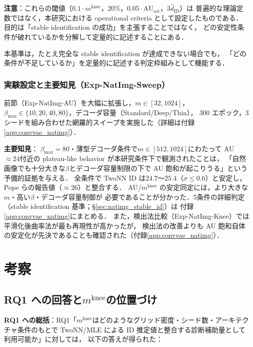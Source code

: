 \documentclass[11pt,a4paper]{jsarticle}
\newcommand{\AUsat}{\mathrm{AU}_{\mathrm{sat}}}
\newcommand{\mknee}{m^{\mathrm{knee}}}
\begin{document}
\textbf{注意}：これらの閾値（$0.1\cdot\mknee$，$20\%$，$0.05\cdot\AUsat$，$3\hat{d}_\mathrm{ID}$）は
普遍的な理論定数ではなく，本研究における operational criteria として設定したものである．
目的は「stable identification の成功」を主張することではなく，
どの安定性条件が破れているかを分解して定量的に記述することにある．

本基準は，たとえ完全な stable identification が達成できない場合でも，
「どの条件が不足しているか」を定量的に記述する判定枠組みとして機能する．

\subsubsection*{実験設定と主要知見（Exp-NatImg-Sweep）}

前節（Exp-NatImg-AU）を大幅に拡張し，$m \in [32, 1024]$，
$\beta_{\max} \in \{10,20,40,80\}$，デコーダ容量（Standard/Deep/Thin），
300 エポック，3シードを組み合わせた網羅的スイープを実施した（詳細は付録\ref{app:convvae_natimg}）．

\textbf{主要知見}：
$\beta_{\max}=80$・薄型デコーダ条件で$m \in [512, 1024]$にわたって AU$\approx 24$付近の
plateau-like behavior が本研究条件下で観測されたことは，
「自然画像でも十分大きな$\beta$とデコーダ容量制限の下で AU 飽和が起こりうる」という
予備的証拠を与える．
全条件で TwoNN ID は$24.7$〜$25.4$（$\sigma \leq 0.6$）と安定し，
Pope ら\cite{pope2021intrinsic}の報告値（$\approx 26$）と整合する．
AU/$\mknee$ の安定同定には，より大きな$m$・高い$\beta$・デコーダ容量制御が
必要であることが分かった．5条件の詳細判定（stable identification 基準；§\ref{sec:natimg_stable_id}）は
付録\ref{app:convvae_natimg}にまとめる．
また，検出法比較（Exp-NatImg-Knee）では平滑化後曲率法が最も再現性が高かったが，
検出法の改善よりも AU 飽和自体の安定化が先決であることも確認された（付録\ref{app:convvae_natimg}）．

\section{考察}\label{sec:discussion}

\subsection{RQ1 への回答と$\mknee$の位置づけ}\label{sec:disc_mknee}

\textbf{RQ1 への総括}：RQ1「$\mknee$はどのようなグリッド密度・シード数・アーキテクチャ条件のもとで
TwoNN/MLE による ID 推定値と整合する診断補助量として利用可能か」に対しては，
以下の答えが得られた：
\end{document}
